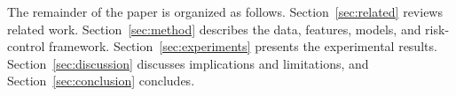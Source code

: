 The remainder of the paper is organized as follows. Section~\ref{sec:related} reviews
related work. Section~\ref{sec:method} describes the data, features,
models, and risk-control framework. Section~\ref{sec:experiments}
presents the experimental results. Section~\ref{sec:discussion}
discusses implications and limitations, and Section~\ref{sec:conclusion} concludes.
